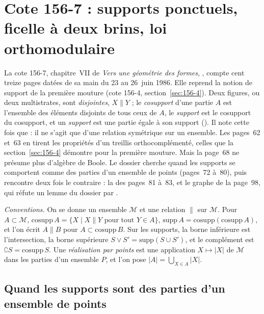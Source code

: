\section[Cote 156-7 : supports ponctuels, ficelle à deux brins, loi orthomodulaire]{Cote 156-7 : supports ponctuels, ficelle à deux brins, loi orthomodulaire\protect{}}\label{sec:156-7}

La cote 156-7, chapitre~VII de \emph{Vers une géométrie des formes}, , compte cent treize pages datées de sa main du 23 au 26~juin 1986. Elle reprend la notion de support de la première mouture (cote 156-4, section~\ref{sec:156-4}). Deux figures, ou deux multistrates, sont \emph{disjointes}, $X \parallel Y$ ; le \emph{cosupport} d'une partie $A$ est l'ensemble des éléments disjoints de tous ceux de $A$, le \emph{support} est le cosupport du cosupport, et un \emph{support} est une partie égale à son support (). Il note cette fois que  : il ne s'agit que d'une relation symétrique sur un ensemble. Les pages~62 et~63 en tirent les propriétés d'un treillis orthocomplémenté, celles que la section~\ref{sec:156-4} démontre pour la première mouture. Mais la page~68 ne présume plus d'algèbre de Boole. Le dossier cherche quand les supports se comportent comme des parties d'un ensemble de points (pages~72 à~80), puis rencontre deux fois le contraire : la  des pages~81 à~83, et le graphe de la page~98, qui réfute un lemme du dossier par .

\noindent\emph{Conventions.} On se donne un ensemble $\mathcal M$ et une relation $\parallel$ sur $\mathcal M$. Pour $A \subset \mathcal M$, $\mathrm{cosupp}\, A = \{X \mid X \parallel Y \text{ pour tout } Y \in A\}$, $\mathrm{supp}\, A = \mathrm{cosupp}(\mathrm{cosupp}\, A)$, et l'on écrit $A \parallel B$ pour $A \subset \mathrm{cosupp}\, B$. Sur les supports, la borne inférieure est l'intersection, la borne supérieure $S \vee S' = \mathrm{supp}(S \cup S')$, et le complément est $\complement S = \mathrm{cosupp}\, S$. Une \emph{réalisation par points} est une application $X \mapsto |X|$ de $\mathcal M$ dans les parties d'un ensemble $P$, et l'on pose $|A| = \bigcup_{X \in A} |X|$.

\subsection*{Quand les supports sont des parties d'un ensemble de points}

